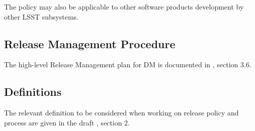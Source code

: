 The policy may also be applicable to other software products development by other \gls{LSST} subsystems.


\subsection{Release Management Procedure} \label{sec:rmproc}

The high-level Release Management plan for \gls{DM} is documented in , section 3.6. 


\subsection{Definitions} \label{sec:defs}

The relevant definition to be considered when working on release policy and process are given in the draft , section 2.
